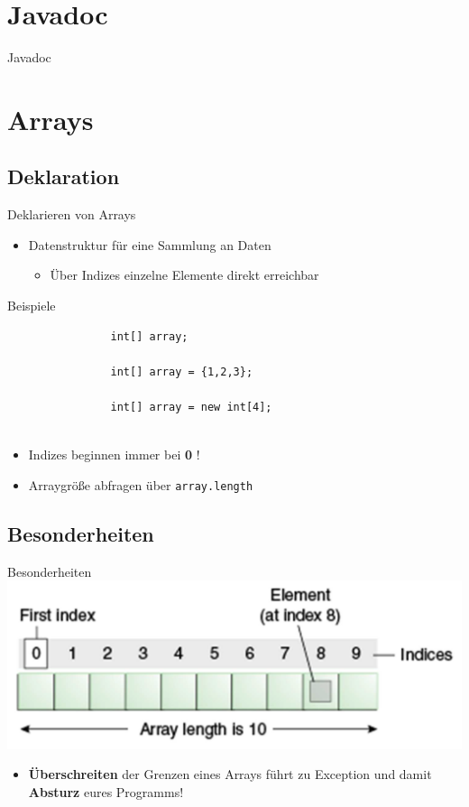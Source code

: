 \documentclass[18pt]{beamer}
\begin{document}
\section{Javadoc}
\begin{frame}[fragile]{Javadoc}
\end{frame}

\section{Arrays}
\subsection{Deklaration}
\begin{frame}[fragile]{Deklarieren von Arrays}
\begin{itemize}
\item Datenstruktur für eine Sammlung an Daten
\pause
\begin{itemize}
\item Über Indizes einzelne Elemente direkt erreichbar
\pause
\end{itemize}
\end{itemize}
\begin{exampleblock}{Beispiele}
	\begin{lstlisting}
				int[] array;
				
				int[] array = {1,2,3};
				
				int[] array = new int[4];
				
	\end{lstlisting}
\end{exampleblock}
\pause
\begin{itemize}
\item Indizes beginnen immer bei \textbf{ 0} !
\pause
\item Arraygröße abfragen über \lstinline{array.length}
\end{itemize}
\end{frame}

\subsection{Besonderheiten}
\begin{frame}[fragile]{Besonderheiten}
\includegraphics[width=\textwidth]{array.png}
\begin{itemize}
	\item \textbf{Überschreiten} der Grenzen eines Arrays führt zu Exception und damit \textbf{Absturz} eures Programms!
\end{itemize}
\end{frame}
\end{document}
